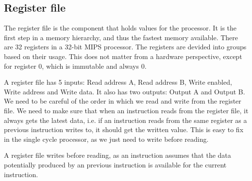\subsection{Register file}
The register file is the component that holds values for the processor. It is
the first step in a memory hierarchy, and thus the fastest memory available.
There are 32 registers in a 32-bit MIPS processor. The registers are devided
into groups based on their usage. This does not matter from a hardware
perspective, except for register 0, which is immutable and always 0.

A register file has 5 inputs: Read address A, Read address B, Write enabled,
Write address and Write data. It also has two outputs: Output A and Output B.
We need to be careful of the order in which we read and write from the register
file. We need to make sure that when an instruction reads from the register
file, it always gets the latest data, i.e. if an instruction reads from the
same register as a previous instruction writes to, it should get the written
value. This is easy to fix in the single cycle processor, as we just need to
write before reading.

A
register file writes before reading, as an instruction assumes that the data
potentially produced by an previous instruction is available for the current
instruction.

